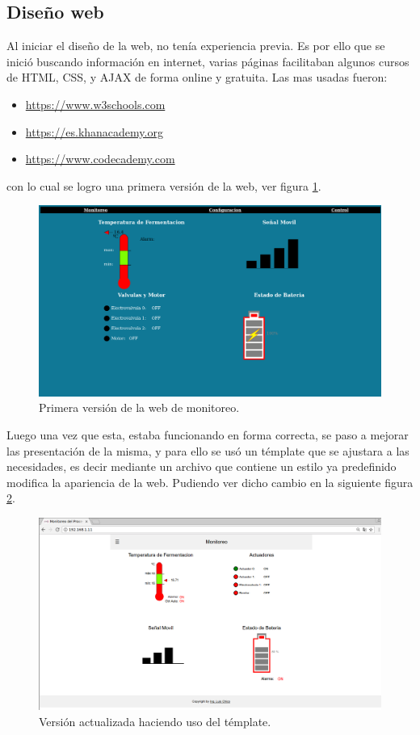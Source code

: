 \subsection*{Diseño web}
Al iniciar el diseño de la web, no tenía experiencia previa. Es por ello que se inició buscando información en internet, varias páginas facilitaban algunos cursos de HTML, CSS, y AJAX  de forma online y gratuita. Las mas usadas fueron:
\begin{itemize}
  \item \url{https://www.w3schools.com}
  \item \url{https://es.khanacademy.org}
  \item \url{https://www.codecademy.com}
\end{itemize}
  con lo cual se logro una primera versión de la web, ver figura \ref{fig:old_web}.
\begin{figure}[!htb]
    \centering
    \includegraphics[scale=.25]{./Figures/old_web.png}
    \caption{Primera versión de la web de monitoreo.}
    \label{fig:old_web}
\end{figure}

Luego una vez que esta, estaba funcionando en forma correcta, se paso a mejorar las presentación de la misma, y para ello se usó un témplate que se ajustara a las necesidades, es decir mediante un archivo que contiene un estilo ya predefinido modifica la apariencia de la web. Pudiendo ver dicho cambio en la siguiente figura \ref{fig:web_monitoreo}.

\begin{figure}[!h]
  \centering
  \includegraphics[scale=.25]{./Figures/web_monitoreo.png}
  \caption{Versión actualizada haciendo uso del témplate.}
  \label{fig:web_monitoreo}
\end{figure}

